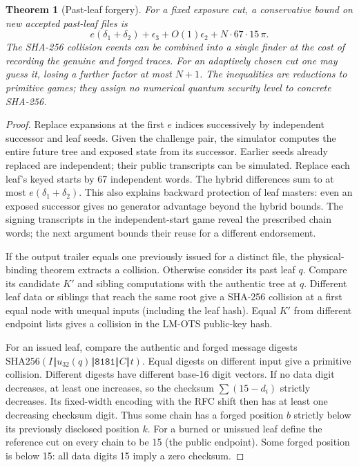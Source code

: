 \documentclass[10pt,twocolumn,letterpaper]{article}
\newtheorem{thm}{Theorem}
\newcommand{\cat}{\mathbin\Vert}
\begin{document}
\begin{thm}[Past-leaf forgery]
For a fixed exposure cut, a conservative bound on new accepted past-leaf files is
\[
 e(\delta_1+\delta_2)+\epsilon_3+
 O(1)\epsilon_2+N\cdot67\cdot15\,\pi .
\]
The SHA-256 collision events can be combined into a single finder at the cost of recording the genuine and forged traces. For an adaptively chosen cut one may guess it, losing a further factor at most $N+1$. The inequalities are reductions to primitive games; they assign no numerical quantum security level to concrete SHA-256.
\end{thm}
\begin{proof}
Replace expansions at the first $e$ indices successively by independent successor and leaf seeds. Given the challenge pair, the simulator computes the entire future tree and exposed state from its successor. Earlier seeds already replaced are independent; their public transcripts can be simulated. Replace each leaf's keyed starts by 67 independent words. The hybrid differences sum to at most $e(\delta_1+\delta_2)$. This also explains backward protection of leaf masters: even an exposed successor gives no generator advantage beyond the hybrid bounds. The signing transcripts in the independent-start game reveal the prescribed chain words; the next argument bounds their reuse for a different endorsement.

If the output trailer equals one previously issued for a distinct file, the physical-binding theorem extracts a collision. Otherwise consider its past leaf $q$. Compare its candidate $K'$ and sibling computations with the authentic tree at $q$. Different leaf data or siblings that reach the same root give a SHA-256 collision at a first equal node with unequal inputs (including the leaf hash). Equal $K'$ from different endpoint lists gives a collision in the LM-OTS public-key hash.

For an issued leaf, compare the authentic and forged message digests $\mathrm{SHA256}(I\cat u_{32}(q)\cat\mathtt{8181}\cat C\cat t)$. Equal digests on different input give a primitive collision. Different digests have different base-16 digit vectors. If no data digit decreases, at least one increases, so the checksum $\sum(15-d_i)$ strictly decreases. Its fixed-width encoding with the RFC shift then has at least one decreasing checksum digit. Thus some chain has a forged position $b$ strictly below its previously disclosed position $k$. For a burned or unissued leaf define the reference cut on every chain to be 15 (the public endpoint). Some forged position is below 15: all data digits 15 imply a zero checksum.


\end{proof}
\end{document}
